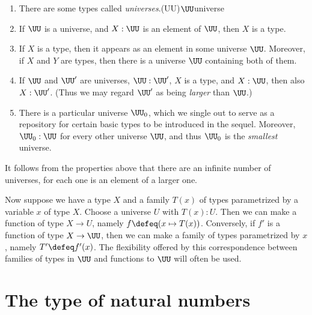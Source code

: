 \begin{enumerate}
  \item There are some types called \emph{universes}.\glossary(UU){$\protect\UU$}{universe}
  \item If $\UU$ is a universe, and $X : \UU$ is an element of $\UU$, then $X$ is a type.
  \item If $X$ is a type, then it appears as an element in some universe $\UU$.
    Moreover, if $X$ and $Y$ are types, then there is a universe $\UU$ containing both of them.
  \item If $\UU$ and $\UU'$ are universes, $\UU:\UU'$, $X$ is a type, and $X:\UU$, then also $X:\UU'$.  (Thus we may regard $\UU'$ as being \emph{larger} than $\UU$.)
  \item There is a particular universe $\UU_0$, which we single out to serve as a repository for certain basic types to be introduced in the sequel.
    Moreover, $\UU_0 : \UU$ for every other universe $\UU$, and thus $\UU_0$ is the \emph{smallest} universe.
\end{enumerate}

It follows from the properties above that there are an infinite number of universes, for each one is an element of a larger one.

Now suppose we have a type $X$ and a family $T(x)$ of types parametrized by a variable $x$ of type $X$.  Choose a universe $U$ with $T(x) : U$.
Then we can make a function of type $X \to U$, namely $f \defeq (x \mapsto T(x))$.  Conversely, if $f'$ is a function of type $X \to \UU$, then
we can make a family of types parametrized by $x$, namely $T' \defeq f'(x)$.  The flexibility offered by this correspondence between families of
types in $\UU$ and functions to $\UU$ will often be used.

\section{The type of natural numbers}
\label{sec:natural-numbers}

